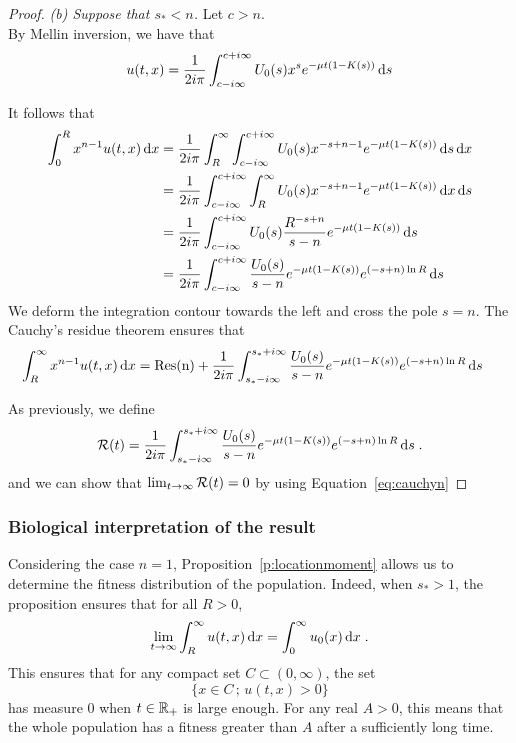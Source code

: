 \begin{proof}
        \textit{(b) Suppose that $s_* < n$.} Let $c >n$. \\
            By Mellin inversion, we have that
            \begin{align*}
                u(t,x) = \frac{1}{2i\pi}\int_{c-i\infty}^{c+i\infty} U_0(s) x^{s} e^{-\mu t(1 - K(s))} \,\mathrm{d} s
            \end{align*}
        
        It follows that
        \begin{align*}
            \int_0^R x^{n-1}u(t,x) \,\mathrm{d} x 
            &= \frac{1}{2i\pi} \int_R^{\infty} \int_{c-i\infty}^{c+i\infty} U_0(s) x^{-s+n-1} e^{-\mu t(1 - K(s))} \,\mathrm{d} s \,\mathrm{d} x \\
            &= \frac{1}{2i\pi} \int_{c-i\infty}^{c+i\infty} \int_R^{\infty} U_0(s) x^{-s+n-1} e^{-\mu t(1 - K(s))} \,\mathrm{d} x \,\mathrm{d} s \\
            &= \frac{1}{2i\pi} \int_{c-i\infty}^{c+i\infty} U_0(s) \frac{R^{-s+n}}{s-n} e^{-\mu t(1 - K(s))} \,\mathrm{d} s \\
            &= \frac{1}{2i\pi} \int_{c-i\infty}^{c+i\infty} \frac{U_0(s)}{s-n} e^{-\mu t(1 - K(s))} e^{(-s+n)\ln R} \,\mathrm{d} s
        \end{align*}
        We deform the integration contour towards the left and cross the pole $s = n$. The Cauchy's residue theorem ensures that
        \begin{align}
            \int_R^{\infty} x^{n-1}u(t,x) \,\mathrm{d} x &= \mathrm{Res(n)} + \frac{1}{2i\pi} \int_{s_*-i\infty}^{s_*+i\infty} \frac{U_0(s)}{s-n} e^{-\mu t(1 - K(s))} e^{(-s+n)\ln R} \,\mathrm{d} s 
            \label{eq:cauchyn}
        \end{align}
        
        As previously, we define
        \begin{align*}
            \mathcal{R}(t) = \frac{1}{2i\pi} \int_{s_*-i\infty}^{s_*+i\infty} \frac{U_0(s)}{s-n} e^{-\mu t(1 - K(s))} e^{(-s+n)\ln R} \,\mathrm{d} s
            \; .
        \end{align*}
        and we can show that $\lim_{t\to\infty}\mathcal{R}(t) = 0$ by using Equation~\ref{eq:cauchyn}
         \end{proof}

        
        \subsubsection{Biological interpretation of the result}
        Considering the case $n = 1$, Proposition~\ref{p:locationmoment} allows us to determine the fitness distribution of the population. Indeed, when $s_* > 1$, the proposition ensures that for all $R > 0$, 
        \begin{align*}
            \lim_{t \to \infty} \int_R^\infty u(t,x) \,\mathrm{d} x = \int_0^\infty u_0(x) \,\mathrm{d} x \; .
        \end{align*} 
        This ensures that for any compact set $ C \subset (0, \infty)$, the set  $$\{ x \in C \,;\, u(t,x) > 0\}$$ has measure $0$ when $t \in \mathbb{R}_+$ is large enough. For any real $A > 0$, this means that the whole population has a fitness greater than $A$ after a sufficiently long time. 

